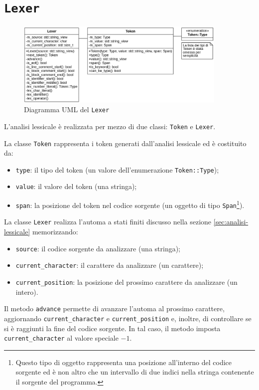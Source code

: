 \section{\texttt{Lexer}}
\label{sec:lexer}

\begin{figure}[H]
	\centering
	\includegraphics[width=0.9\textwidth]{figures/lexer.png}
	\caption{Diagramma UML del \texttt{Lexer}}
	\label{fig:lexer-uml}
\end{figure}

L'analisi lessicale \`e realizzata per mezzo di due classi: \texttt{Token} e \texttt{Lexer}.

La classe \texttt{Token} rappresenta i token generati dall'analisi lessicale ed \`e costituito da:
\begin{itemize}
	\item \texttt{type}: il tipo del token (un valore dell'enumerazione \texttt{Token::Type});
	\item \texttt{value}: il valore del token (una stringa);
	\item \texttt{span}: la posizione del token nel codice sorgente (un oggetto di tipo \texttt{Span}\footnote{Questo tipo di oggetto rappresenta una posizione all'interno del codice sorgente ed \`e non altro che un intervallo di due indici nella stringa contenente il sorgente del programma.}).
\end{itemize}

La classe \texttt{Lexer} realizza l'automa a stati finiti discusso nella sezione \ref{sec:analisi-lessicale} memorizzando:
\begin{itemize}
	\item \texttt{source}: il codice sorgente da analizzare (una stringa);
	\item \texttt{current\_character}: il carattere da analizzare (un carattere);
	\item \texttt{current\_position}: la posizione del prossimo carattere da analizzare (un intero).
\end{itemize}
Il metodo \texttt{advance} permette di avanzare l'automa al prossimo carattere, aggiornando \texttt{current\_character} e \texttt{current\_position} e, inoltre, di controllare se si \`e raggiunti la fine del codice sorgente. In tal caso, il metodo imposta \texttt{current\_character} al valore speciale $-1$.

